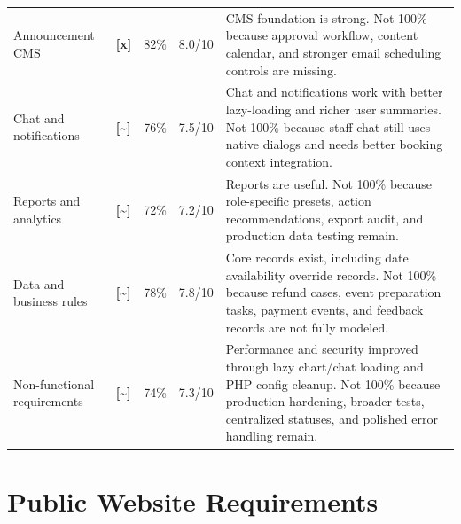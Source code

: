 \documentclass[11pt,a4paper]{article}
\newcommand{\statusdone}{\textbf{[x]}}
\newcommand{\statuspartial}{\textbf{[{\textasciitilde}]}}
\begin{document}
\begin{longtable}{L{0.20\textwidth} C{0.10\textwidth} C{0.12\textwidth} C{0.13\textwidth} L{0.35\textwidth}}
Announcement CMS & \statusdone & 82\% & 8.0/10 & CMS foundation is strong. Not 100\% because approval workflow, content calendar, and stronger email scheduling controls are missing. \\
Chat and notifications & \statuspartial & 76\% & 7.5/10 & Chat and notifications work with better lazy-loading and richer user summaries. Not 100\% because staff chat still uses native dialogs and needs better booking context integration. \\
Reports and analytics & \statuspartial & 72\% & 7.2/10 & Reports are useful. Not 100\% because role-specific presets, action recommendations, export audit, and production data testing remain. \\
Data and business rules & \statuspartial & 78\% & 7.8/10 & Core records exist, including date availability override records. Not 100\% because refund cases, event preparation tasks, payment events, and feedback records are not fully modeled. \\
Non-functional requirements & \statuspartial & 74\% & 7.3/10 & Performance and security improved through lazy chart/chat loading and PHP config cleanup. Not 100\% because production hardening, broader tests, centralized statuses, and polished error handling remain. \\
\bottomrule
\end{longtable}

\section{Public Website Requirements}
\end{document}
